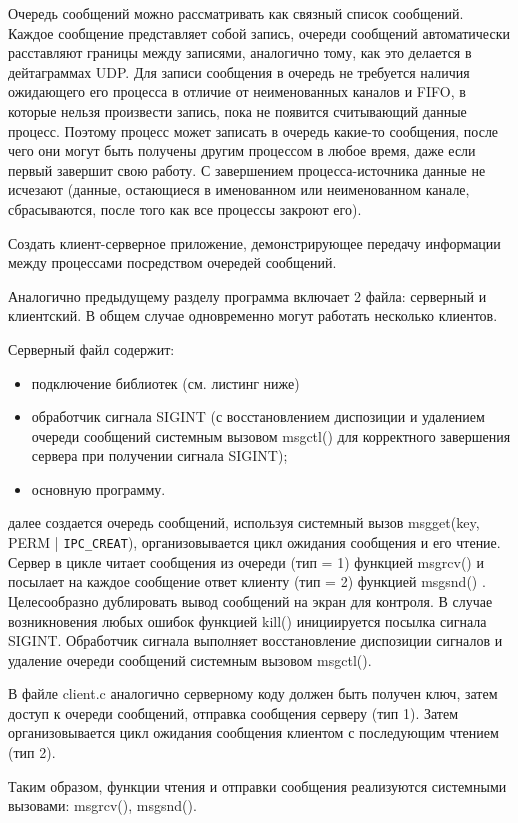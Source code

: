 \documentclass[a4paper]{article}
\begin{document}
	Очередь сообщений можно рассматривать как связный список сообщений. Каждое сообщение представляет собой запись, очереди сообщений автоматически расставляют границы между записями, аналогично тому, как это делается в дейтаграммах UDP. Для записи сообщения в очередь не требуется наличия ожидающего его процесса в отличие от неименованных каналов и FIFO, в которые нельзя произвести запись, пока не появится считывающий данные процесс. Поэтому процесс может записать в очередь какие-то сообщения, после чего они могут быть получены другим процессом в любое время, даже если первый завершит свою работу. С завершением процесса-источника данные не исчезают (данные, остающиеся в именованном или неименованном канале, сбрасываются, после того как все процессы закроют его).
	
	Создать клиент-серверное приложение, демонстрирующее передачу информации между процессами посредством очередей сообщений.

	Аналогично предыдущему разделу программа включает 2 файла: серверный и клиентский. В общем случае одновременно могут работать несколько клиентов.
	
	Серверный файл содержит:
	\begin{itemize}
	\item подключение библиотек (см. листинг ниже)
	\item обработчик сигнала SIGINT (с восстановлением диспозиции и удалением очереди сообщений системным вызовом msgctl() для корректного завершения сервера при получении сигнала SIGINT);
	\item основную программу.
	\end{itemize}
далее создается очередь сообщений, используя системный вызов msgget(key, PERM | \texttt{IPC\_CREAT}), организовывается цикл ожидания сообщения и его чтение. Сервер в цикле читает сообщения из очереди (тип = 1) функцией msgrcv() и посылает на каждое сообщение ответ клиенту (тип = 2) функцией msgsnd() . Целесообразно дублировать вывод сообщений на экран для контроля. В случае возникновения любых ошибок функцией kill() инициируется посылка сигнала SIGINT. Обработчик сигнала выполняет восстановление диспозиции сигналов и удаление очереди сообщений системным вызовом msgctl().

	В файле client.c аналогично серверному коду должен быть получен ключ, затем доступ к очереди сообщений, отправка сообщения серверу (тип 1). Затем организовывается цикл ожидания сообщения клиентом с последующим чтением (тип 2).
	
	Таким образом, функции чтения и отправки сообщения реализуются системными вызовами: msgrcv(), msgsnd().
	
\end{document}
